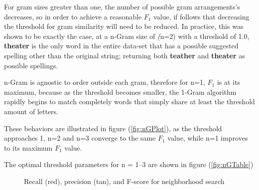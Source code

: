 \documentclass[twocolumn]{article}
\begin{document}
    For gram sizes greater than one, the number of possible gram arrangements's decreases, so in order to achieve a reasonable
    $F_1$ value, if follows that decreasing the threshold for gram similarity will need to be reduced.
    In practice, this was shown to be exactly the case, at a n-Gram size of \textit(n=2) with a threshold of 1.0,
    \textbf{theater} is the only word in the entire data-set that has a possible
    suggested spelling other than the original string;
    returning both \textbf{teather} and \textbf{theater} as possible spellings.

    n-Gram is agnostic to order outside each gram, therefore for n=1, $F_1$ is at its maximum, because as the threshold
    becomes smaller, the 1-Gram algorithm rapidly begins to match completely words that simply share at least the threshold
    amount of letters.

    These behaviors are illustrated in figure (\ref{fig:nGPlot}), as the threshold approaches 1, n=2 and n=3
    converge to the same $F_1$ value, while n=1 improves to its maximum $F_1$ value.

    The optimal threshold parameters for n = 1--3 are shown in figure (\ref{fig:nGTable})








    \begin{figure}[h]
        \caption{Recall (red), precision (tan), and F-score for neighborhood search}
        \label{NeiPlot}
    \end{figure}
\end{document}
